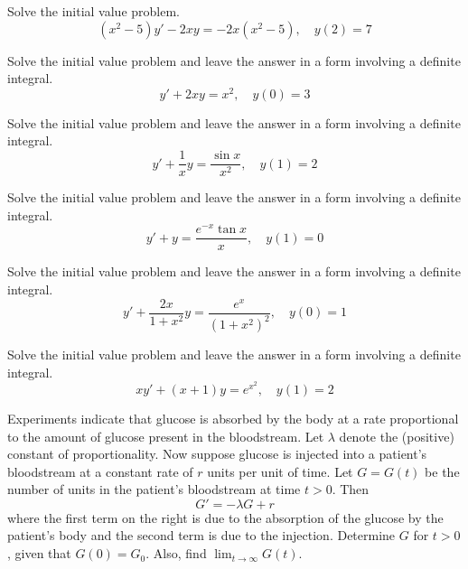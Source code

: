 \documentclass{ximera}
\begin{document}
\begin{problem}\label{exer:2.1.37} Solve the initial value problem.
$$(x^2-5)y'-2xy=-2x(x^2-5),\quad y(2)=7$$
\end{problem}

\begin{problem}\label{exer:2.1.38} Solve the initial value problem and leave the answer in a form involving a definite integral.
$$y'+2xy=x^2,\quad y(0)=3$$
\end{problem}

\begin{problem}\label{exer:2.1.39} Solve the initial value problem and leave the answer in a form involving a definite integral.
$$y'+\frac{1}{x}y=\frac{\sin x}{x^2},\quad y(1)=2$$
\end{problem}

\begin{problem}\label{exer:2.1.40} Solve the initial value problem and leave the answer in a form involving a definite integral.
$$y'+y=\frac{e^{-x}\tan x}{x},\quad y(1)=0$$
\end{problem}

\begin{problem}\label{exer:2.1.41} Solve the initial value problem and leave the answer in a form involving a definite integral.
$$y'+\frac{2x}{1+x^2}y=\frac{e^x}{(1+x^2)^2}, \quad y(0)=1$$
\end{problem}

\begin{problem}\label{exer:2.1.42} Solve the initial value problem and leave the answer in a form involving a definite integral.
$$xy'+(x+1)y=e^{x^2},\quad y(1)=2$$
\end{problem}

\begin{problem}\label{exer:2.1.43}
Experiments indicate that glucose is absorbed by the body at a rate proportional to the amount of glucose present in the bloodstream. Let $\lambda$ denote the (positive) constant of proportionality. Now suppose glucose is injected into a patient's bloodstream at a constant rate of $r$ units per unit of time. Let $G=G(t)$ be the number of units in the patient's bloodstream at time $t>0$. Then
$$G'=-\lambda G+r$$
where the first term on the right is due to the absorption of the glucose by the patient's body and the second term is due to the injection. Determine $G$ for $t>0$, given that $G(0)=G_0$. Also, find $\lim_{t\to\infty}G(t)$.
\end{problem}
\end{document}
